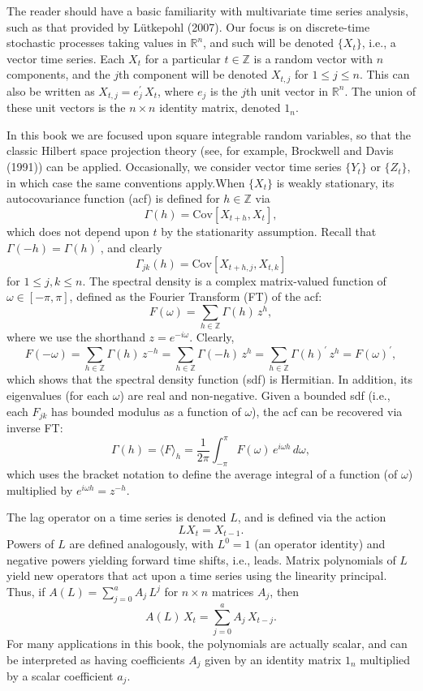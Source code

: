 \documentclass[a4paper]{book}
\def\RR{\mathbb R}
\def\ZZ{\mathbb Z}
\begin{document}
The reader should have a basic familiarity with multivariate time
 series analysis, such as that provided by L\"utkepohl (2007).  
 Our focus is on discrete-time stochastic processes taking values in $\RR^n$,
 and such will be denoted $\{ X_t \}$, i.e., a vector time series.
   Each $X_t$ for  a particular   $t \in \ZZ$ is a random vector 
 with $n$ components, and 
 the $j$th component will be denoted $X_{t,j}$ for $1 \leq j \leq n$.
  This can also be written as $X_{t,j} = e_j^{\prime} \, X_t$, where
 $e_j$ is the $j$th unit vector in $\RR^n$.  The union of these
 unit vectors is the $n \times n$ identity matrix, denoted $1_n$.

 In this book we are focused upon square integrable random variables,
 so that the classic Hilbert space projection theory (see, for example,
 Brockwell and Davis (1991)) can be applied.   Occasionally, we consider 
  vector time series $\{ Y_t \}$ or $\{ Z_t \}$, in which case the 
 same conventions apply.When $\{ X_t \}$ is 
 weakly stationary, its autocovariance function (acf)
 is defined for $h \in \ZZ$  via 
\[
   \Gamma (h) = \mbox{Cov} [ X_{t+h}, X_t ],
\]
 which does not depend upon $t$ by the stationarity assumption.  Recall
 that $\Gamma (-h) = { \Gamma (h) }^{\prime}$, and clearly
\[
   \Gamma_{jk} (h) = \mbox{Cov} [ X_{t+h,j}, X_{t,k} ]
\]
 for $1 \leq j,k \leq n$. The spectral density is a complex matrix-valued
 function of $\omega \in [-\pi, \pi]$, defined as the 
 Fourier Transform (FT) of the acf:
\[
   F (\omega) = \sum_{h \in \ZZ} \Gamma (h) \, z^h,
\]
 where we use the shorthand $z = e^{-i \omega}$.  Clearly,
\[
    F(-\omega) = 
   \sum_{h \in \ZZ} \Gamma (h) \, z^{-h} 
   = \sum_{h \in \ZZ} \Gamma (-h) \, z^h = 
  \sum_{h \in \ZZ} { \Gamma (h) }^{\prime} \, z^h = { F (\omega) }^{\prime},
\]
 which shows that the spectral density function (sdf) is Hermitian.
  In addition, its eigenvalues (for each $\omega$) are real and non-negative.
  Given a bounded sdf (i.e., each $F_{jk} $ has bounded modulus as a function
 of $\omega$), the acf can be recovered via inverse FT:
\begin{equation}
 \label{eq:spec2acf}
  \Gamma (h) = { \langle F  \rangle }_h
  =  \frac{1}{2 \pi} \int_{-\pi}^{\pi} F(\omega) \, e^{i \omega h}
  \, d\omega,
\end{equation}
 which uses the bracket notation to define the average integral of a 
 function (of $\omega$) multiplied by $e^{i \omega h} = z^{-h}$.

 The lag operator on a time series is denoted $L$, and is defined via
 the action
\[
  L X_t = X_{t-1}.
\]
  Powers  of $L$ are defined analogously, with $L^0 = 1$ (an operator
 identity) and negative powers yielding forward time shifts, i.e., leads.
 Matrix polynomials of $L$ yield new operators that act upon a time series
 using the linearity principal.  Thus, if $A(L) = \sum_{j=0}^a A_j \, L^j$
 for $n \times n$ matrices $A_j$, then
\[
  A(L) \, X_t = \sum_{j=0}^a A_j \, X_{t-j}.
\] 
  For many applications in this book, the polynomials are actually scalar,
 and can be interpreted as having coefficients $A_j$ given by an  
 identity matrix $1_n$ multiplied by a scalar coefficient $a_j$.
 
\end{document}
